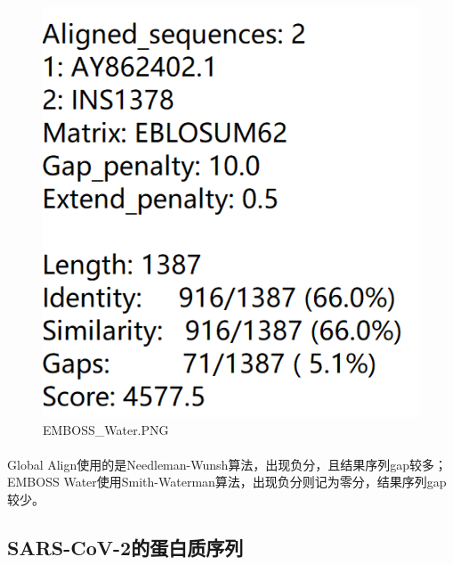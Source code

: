 \documentclass[supercite]{HustGraduPaper}
\begin{document}
		\begin{figure}[H]
			\centering
			\includegraphics[width=1\textwidth]{./material/practice2/emboss_water.png}
			\caption{EMBOSS\_Water.PNG}
		\end{figure}
		\paragraph{}\label{subpara:subpara}Global Align使用的是Needleman-Wunsh算法，出现负分，且结果序列gap较多；EMBOSS Water使用Smith-Waterman算法，出现负分则记为零分，结果序列gap较少。
	\subsection{SARS-CoV-2的蛋白质序列}
\end{document}
